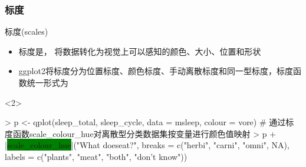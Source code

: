\subsubsection{标度}
\begin{frame}[t,fragile]{\subsecname}{标度(scales)}
\begin{itemize}
\item 标度是，
将数据转化为视觉上可以感知的颜色、大小、位置和形状
\item ggplot2将标度分为位置标度、颜色标度、手动离散标度和同一型标度，标度函数统一形式为
\end{itemize}

\begin{overlayarea}{\textwidth}{\textheight}

\begin{onlyenv}<2>
\begin{minipage}{\textwidth}
\begin{rcode}
> p <- qplot(sleep_total, sleep_cycle, data = msleep, colour = vore)
# 通过标度函数scale\_colour\_hue对离散型分类数据集按变量进行颜色值映射
> p + |\colorbox{green}{scale\_colour\_hue}|("What does\nit eat?", breaks = c("herbi", "carni", "omni", NA), labels = c("plants", "meat", "both", "don’t know"))
\end{rcode}
\end{minipage}


\end{onlyenv}
\end{overlayarea}
\end{frame}
